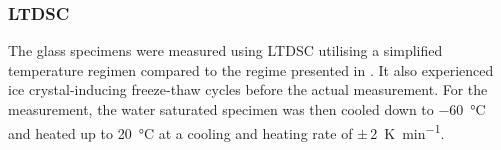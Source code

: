 

\FloatBarrier
\subsubsection{\acs*{LTDSC}}

The glass specimens were measured using \ac{LTDSC} \cite{kleiner.2026i} utilising a simplified temperature regimen compared to the regime presented in .
It also experienced ice crystal-inducing freeze-thaw cycles before the actual measurement.
For the measurement, the water saturated specimen was then cooled down to \qty{-60}{\celsius} and heated up to \qty{20}{\celsius} at a cooling and heating rate of $\pm$\,\qty{2}{\kelvin\per\minute}.

